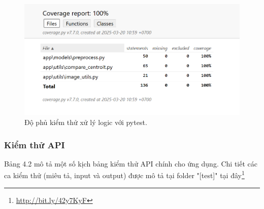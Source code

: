 
\begin{figure}[H]
    \centering  
    \includegraphics[width=1\textwidth]{figures/c4/4-3/pytest_2.png}
    \caption{Độ phủ kiểm thử xử lý logic với pytest.}
    \label{fig:pytest-testing}
\end{figure}


\subsubsection{Kiểm thử API}

Bảng 4.2 mô tả một số kịch bảng kiểm thử API chính cho ứng dụng. Chi tiết các ca kiểm thử (miêu tả, input và output) được mô tả tại folder "[test]" tại đây\footnote{\url{http://bit.ly/42y7KyF}}

